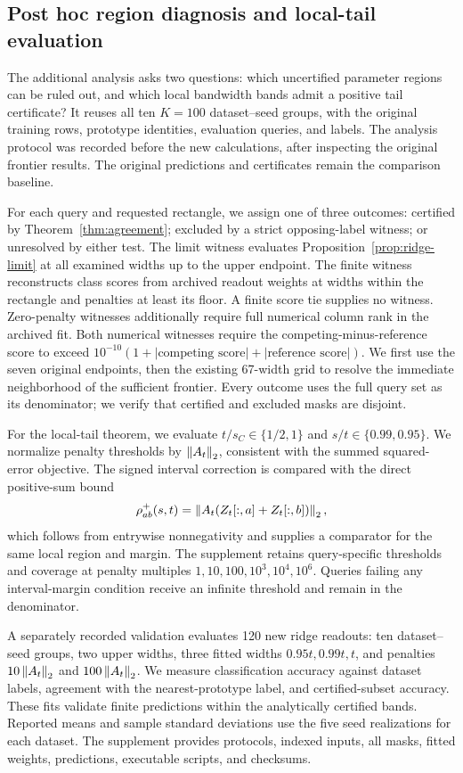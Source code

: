 \subsection{Post hoc region diagnosis and local-tail evaluation}
\label{sec:new-design}
The additional analysis asks two questions: which uncertified parameter regions can be ruled out, and which local bandwidth bands admit a positive tail certificate? It reuses all ten $K=100$ dataset--seed groups, with the original training rows, prototype identities, evaluation queries, and labels. The analysis protocol was recorded before the new calculations, after inspecting the original frontier results. The original predictions and certificates remain the comparison baseline.

For each query and requested rectangle, we assign one of three outcomes: certified by Theorem~\ref{thm:agreement}; excluded by a strict opposing-label witness; or unresolved by either test. The limit witness evaluates Proposition~\ref{prop:ridge-limit} at all examined widths up to the upper endpoint. The finite witness reconstructs class scores from archived readout weights at widths within the rectangle and penalties at least its floor. A finite score tie supplies no witness. Zero-penalty witnesses additionally require full numerical column rank in the archived fit. Both numerical witnesses require the competing-minus-reference score to exceed $10^{-10}(1+|\text{competing score}|+|\text{reference score}|)$. We first use the seven original endpoints, then the existing 67-width grid to resolve the immediate neighborhood of the sufficient frontier. Every outcome uses the full query set as its denominator; we verify that certified and excluded masks are disjoint.

For the local-tail theorem, we evaluate $t/s_C\in\{1/2,1\}$ and $s/t\in\{0.99,0.95\}$. We normalize penalty thresholds by $\left\lVert A_t\right\rVert_2$, consistent with the summed squared-error objective. The signed interval correction is compared with the direct positive-sum bound
\[
 \rho^{+}_{ab}(s,t)=\left\lVert A_t(Z_t[:,a]+Z_t[:,b])\right\rVert_2,
\]
which follows from entrywise nonnegativity and supplies a comparator for the same local region and margin. The supplement retains query-specific thresholds and coverage at penalty multiples $1,10,100,10^3,10^4,10^6$. Queries failing any interval-margin condition receive an infinite threshold and remain in the denominator.

A separately recorded validation evaluates 120 new ridge readouts: ten dataset--seed groups, two upper widths, three fitted widths $0.95t,0.99t,t$, and penalties $10\left\lVert A_t\right\rVert_2$ and $100\left\lVert A_t\right\rVert_2$. We measure classification accuracy against dataset labels, agreement with the nearest-prototype label, and certified-subset accuracy. These fits validate finite predictions within the analytically certified bands. Reported means and sample standard deviations use the five seed realizations for each dataset. The supplement provides protocols, indexed inputs, all masks, fitted weights, predictions, executable scripts, and checksums.
